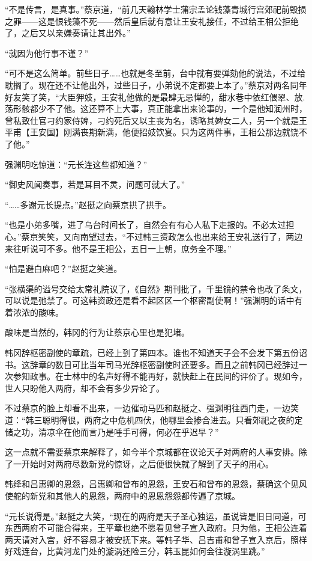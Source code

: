 “不是传言，是真事。”蔡京道，“前几天翰林学士蒲宗孟论钱藻青城行宫郊祀前毁损之罪——这是恨钱藻不死——然后皇后就有意让王安礼接任，不过给王相公拒绝了，之后又以亲嫌奏请让其出外。”

“就因为他行事不谨？”

“可不是这么简单。前些日子……也就是冬至前，台中就有要弹劾他的说法，不过给耽搁了。现在还不让他出外，过些日子，小弟说不定都要上本了。”蔡京对两名同年好友笑了笑，“大臣狎妓，王安礼他做的是最肆无忌惮的，甜水巷中依红偎翠、放.荡形骸都少不了他。这还算不上大事，真正能拿出来论事的，一个是他知润州时，曾私致仕官刁约家侍婢，刁约死后又以主丧为名，诱略其婢女二人，另一个就是王平甫【王安国】刚满丧期新满，他便招妓饮宴。只为这两件事，王相公那边就饶不了他。”

强渊明吃惊道：“元长连这些都知道？”

“御史风闻奏事，若是耳目不灵，问题可就大了。”

“……多谢元长提点。”赵挺之向蔡京拱了拱手。

“也是小弟多嘴，进了乌台时间长了，自然会有有心人私下走报的。不必太过担心。”蔡京笑笑，又向南望过去，“不过韩三资政怎么也出来给王安礼送行了，两边来往听说可不多。他不是王相公，五日一上朝，庶务全不理。”

“怕是避白麻吧？”赵挺之笑道。

“张横渠的谥号交给太常礼院议了，《自然》期刊批了，千里镜的禁令也改了条文，可以说是弛禁了。可这韩资政还是看不起区区一个枢密副使啊！”强渊明的话中有着浓浓的酸味。

酸味是当然的，韩冈的行为让蔡京心里也是犯堵。

韩冈辞枢密副使的章疏，已经上到了第四本。谁也不知道天子会不会发下第五份诏书。这辞章的数目可比当年司马光辞枢密副使时还要多。而且之前韩冈已经辞过一次参知政事。在士林中的名声好得不能再好，就快赶上在民间的评价了。现如今，世人只盼他入两府，却不会有多少异论了。

不过蔡京的脸上却看不出来，一边催动马匹和赵挺之、强渊明往西门走，一边笑道：“韩三聪明得很，两府之中危机四伏，他哪里会掺合进去。只看郊祀之夜的定储之功，清凉伞在他而言乃是唾手可得，何必在乎迟早？”

这一点就不需要蔡京来解释了，如今半个京城都在议论天子对两府的人事安排。除了一开始时对两府尽数新党的惊讶，之后便很快就了解到了天子的用心。

韩绛和吕惠卿的恩怨，吕惠卿和曾布的恩怨，王安石和曾布的恩怨，蔡确这个见风使舵的新党和其他人的恩怨，两府中的恩恩怨怨都传遍了京城。

“元长说得是。”赵挺之大笑，“现在的两府是天子圣心独运，虽说皆是旧日同道，可东西两府不可能合得来，王平章也绝不愿看见曾子宣入政府。只为他，王相公连着两天请对入宫，好不容易才被安抚下来。等韩子华、吕吉甫和曾子宣入京后，照样好戏连台，比黄河龙门处的漩涡还险三分，韩玉昆如何会往漩涡里跳。”

